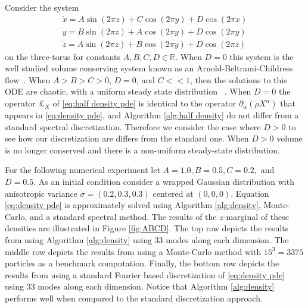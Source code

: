 \documentclass[final,leqno]{siamart}
\begin{document}
Consider the system
\begin{align*}
	\dot{x} = A \sin( 2\pi z) + C \cos(2\pi y)  + D \cos(2\pi x)\\
	\dot{y} = B \sin( 2\pi z) + A \cos(2\pi y)  + D \cos(2\pi y)\\
	\dot{z} = A \sin( 2\pi z) + B \cos(2\pi y)  + D \cos(2\pi z)
\end{align*}
on the three-torus for constants $A,B,C,D \in \mathbb{R}$.  
When $D=0$ this system is the well studied volume conserving system known as an Arnold-Beltrami-Childress flow~\cite{ArnoldKhesin1992}.
When $A > B > C > 0$, $D=0$, and $C << 1$, then the solutions to this ODE are chaotic, with a uniform steady state distribution ~\cite{MajdaBertozzi2002}.
When $D=0$ the operator $\pounds_{X}$ of \eqref{eq:half density pde} is identical to the operator $\partial_{\alpha}( \rho X^{\alpha})$ that appears in \eqref{eq:density pde}, and Algorithm \ref{alg:half density} do not differ from a standard spectral discretization.
Therefore we consider the case where $D > 0$ to see how our discretization are differs from the standard one.
When $D> 0$ volume is no longer conserved and there is a non-uniform steady-state distribution.

For the following numerical experiment let $A=1.0,B=0.5,C=0.2,$ and $D=0.5$.
As an initial condition consider a wrapped Gaussian distribution with anisotropic variance $\sigma= (0.2, 0.3, 0.3)$ centered at $(0,0,0)$.
Equation \eqref{eq:density pde} is approximately solved using Algorithm \ref{alg:density}, Monte-Carlo, and a standard spectral method.
The results of the $z$-marginal of these densities are illustrated in Figure \ref{fig:ABCD}.
The top row depicts the results from using Algorithm \ref{alg:density} using $33$ modes along each dimension.
The middle row depicts the results from using a Monte-Carlo method with $15^{3} = 3375$ particles as a benchmark computation.
Finally, the bottom row depicts the results from using a standard Fourier based discretization of \eqref{eq:density pde} using 33 modes along each dimension.
Notice that Algorithm \ref{alg:density} performs well when compared to the standard discretization approach.
\end{document}
